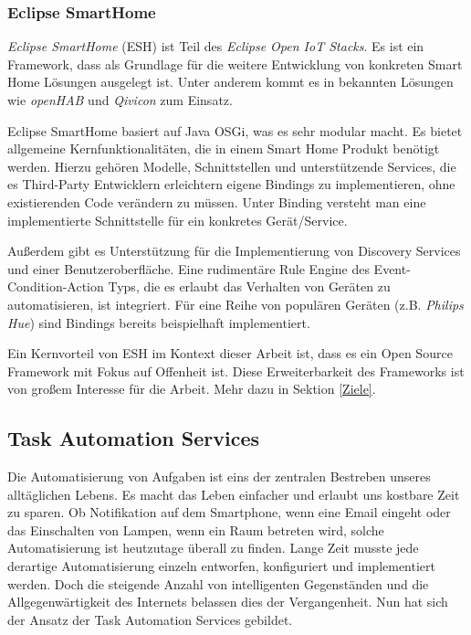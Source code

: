 \documentclass[12pt]{article}
\begin{document}
\subsubsection{Eclipse SmartHome}
\textit{Eclipse SmartHome} (ESH)\cite{ESH} ist Teil des \textit{Eclipse Open IoT Stacks}\cite{EOIoT}. Es ist ein Framework, dass als Grundlage für die weitere Entwicklung von konkreten Smart Home Lösungen ausgelegt ist. Unter anderem kommt es in bekannten Lösungen wie \textit{openHAB} und \textit{Qivicon} zum Einsatz.

Eclipse SmartHome basiert auf Java OSGi, was es sehr modular macht. Es bietet allgemeine Kernfunktionalitäten, die in einem Smart Home Produkt benötigt werden. Hierzu gehören Modelle, Schnittstellen und unterstützende Services, die es Third-Party Entwicklern erleichtern eigene Bindings zu implementieren, ohne existierenden Code verändern zu müssen. Unter Binding versteht man eine implementierte Schnittstelle für ein konkretes Gerät/Service. 

Außerdem gibt es Unterstützung für die Implementierung von Discovery Services  und einer Benutzeroberfläche. Eine rudimentäre Rule Engine des Event-Condition-Action Typs\cite{ECA}, die es erlaubt das Verhalten von Geräten zu automatisieren, ist integriert. Für eine Reihe von populären Geräten (z.B. \textit{Philips Hue}) sind Bindings bereits beispielhaft implementiert.

Ein Kernvorteil von ESH im Kontext dieser Arbeit ist, dass es ein Open Source Framework mit Fokus auf Offenheit ist. Diese Erweiterbarkeit des Frameworks ist von großem Interesse für die Arbeit. Mehr dazu in Sektion \ref{Ziele}.

\subsection{Task Automation Services}
Die Automatisierung von Aufgaben ist eins der zentralen Bestreben unseres alltäglichen Lebens. Es macht das Leben einfacher und erlaubt uns kostbare Zeit zu sparen. Ob Notifikation auf dem Smartphone, wenn eine Email eingeht oder das Einschalten von Lampen, wenn ein Raum betreten wird, solche Automatisierung ist heutzutage überall zu finden. Lange Zeit musste jede derartige Automatisierung einzeln entworfen, konfiguriert und implementiert werden. Doch die steigende Anzahl von intelligenten Gegenständen und die Allgegenwärtigkeit des Internets belassen dies der Vergangenheit. Nun hat sich der Ansatz der Task Automation Services\cite{ieee:tas} gebildet.
\end{document}
